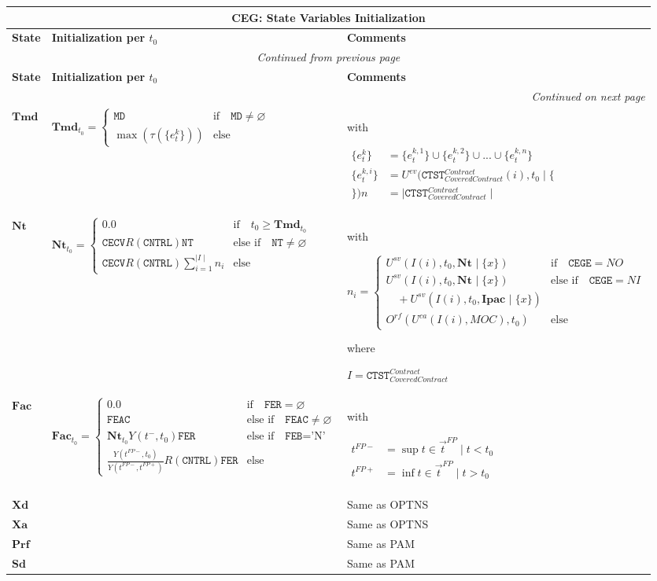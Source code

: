 \documentclass[9pt,oneside]{amsart}
\newenvironment{states}[1]{
	\hfill %
	\begin{longtable}{| p{0.05\textwidth} | p{0.48\textwidth} |  p{0.43\textwidth} |}
	\multicolumn{3}{c}{\textbf{#1: State Variables Initialization}}\\
	\hline
	\textbf{State} & \textbf{Initialization per $t_0$} & \textbf{Comments} \\
	\hline
	\endfirsthead
	\multicolumn{3}{c}{\textit{Continued from previous page}} \\
	\hline
	\textbf{State} & \textbf{Initialization per $t_0$} & \textbf{Comments} \\
	\hline
	\endhead
	\hline \multicolumn{3}{r}{\textit{Continued on next page}} \\
	\endfoot
	\endlastfoot
}{%
	\hline
	\end{longtable}
}
\newcommand{\svar}[2]{\textbf{#1}_{#2}}
\newcommand{\attr}[1]{\texttt{#1}}
\newcommand{\sgn}{R(\attr{CNTRL})}
\newcommand{\yfr}[2]{Y(#1,#2)}
\newcommand{\obs}[3]{O^{#1}(#2,#3)}
\newcommand{\cldev}[3]{U^{ev}(#1,#2 \mid\{#3\})}
\newcommand{\cldsv}[4]{U^{sv}(#1,#2,\svar{#3}{} \mid\{#4\})}
\newcommand{\cldca}[2]{U^{ca}(#1,#2)}
\newcommand{\undef}{\varnothing}
\newcommand{\tev}[1]{\tau(#1)}
\begin{document}
\begin{states}{CEG}
	$\svar{Tmd}{}$ & $\svar{Tmd}{t_0}=\begin{cases} \attr{MD} & \text{if}\quad \attr{MD}\neq\undef \\
				\max(\tev{\{e_t^k\}}) & \text{else} \end{cases}$
				& with\par
					{$\begin{aligned}
						\{e_t^k\} &= \{e_t^{k,1}\}\cup\{e_t^{k,2}\}\cup ...\cup\{e_t^{k,n}\} \\
						\{e_t^{k,i}\} &= \cldev{\attr{CTST}_{CoveredContract}^{Contract}(i)}{t_0}\\
						n &= \mid \attr{CTST}_{CoveredContract}^{Contract} \mid \end{aligned}$} \\
	\hline
	$\svar{Nt}{}$ & $\svar{Nt}{t_0} = \begin{cases}
							0.0 & \text{if}\quad t_0\geq\svar{Tmd}{t_0} \\
							\attr{CECV}\sgn\attr{NT} & \text{else if}\quad \attr{NT}\neq\undef \\
							\attr{CECV}\sgn\sum_{i=1}^{\mid I\mid} n_i & \text{else} \end{cases}$ & with\par
			$n_i=\begin{cases} \cldsv{I(i)}{t_0}{Nt}{x} & \text{if}\quad \attr{CEGE}=NO \\
					\cldsv{I(i)}{t_0}{Nt}{x} & \text{else if}\quad \attr{CEGE}=NI \\
					\quad + \cldsv{I(i)}{t_0}{Ipac}{x} & \\
					\obs{rf}{\cldca{I(i)}{MOC}}{t_0} & \text{else} \end{cases}$ \par
	where\par
	$I=\attr{CTST}_{CoveredContract}^{Contract}$ \\
	\hline
	$\svar{Fac}{}$ & $\svar{Fac}{t_0} = \begin{cases} 0.0 & \text{if} \quad \attr{FER}=\undef \\
					\attr{FEAC} & \text{else if} \quad \attr{FEAC} \neq \undef \\
					\svar{Nt}{t_0}\yfr{t^-}{t_0}\attr{FER} & \text{else if} \quad \attr{FEB}=\text{'N'} \\
					\frac{\yfr{t^{FP-}}{t_0}}{\yfr{t^{FP-}}{t^{FP+}}}\sgn\attr{FER} & \text{else} \end{cases}$ &
			with\par
			{$\begin{aligned}
						t^{FP-} &= \sup t \in \vec{t}^{FP}\mid t<t_0 \\
						t^{FP+} &= \inf t \in \vec{t}^{FP}\mid t>t_0 \end{aligned}$} \\
  	\hline
	$\svar{Xd}{}$ & & Same as OPTNS \\
	\hline
	$\svar{Xa}{}$ & & Same as OPTNS \\
	\hline
	$\svar{Prf}{}$ & & Same as PAM \\
	\hline
	$\svar{Sd}{}$ & & Same as PAM \\
\end{states}
\end{document}
